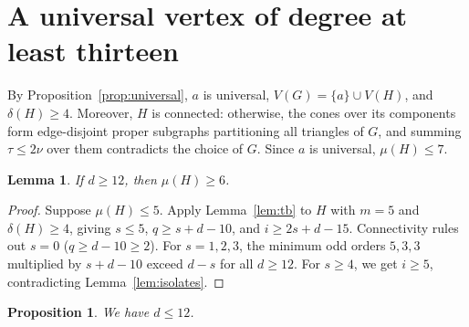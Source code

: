 \documentclass[11pt]{article}
\newtheorem{lemma}[theorem]{Lemma}
\newtheorem{proposition}[theorem]{Proposition}
\begin{document}
\section{A universal vertex of degree at least thirteen}

By Proposition~\ref{prop:universal}, $a$ is universal, $V(G)=\{a\}\cup V(H)$, and $\delta(H)\geq 4$. Moreover, $H$ is connected: otherwise, the cones over its components form edge-disjoint proper subgraphs partitioning all triangles of $G$, and summing $\tau\leq 2\nu$ over them contradicts the choice of $G$. Since $a$ is universal, $\mu(H)\leq 7$.

\begin{lemma}\label{lem:mu-at-least-6}
If $d\geq 12$, then $\mu(H)\geq 6$.
\end{lemma}

\begin{proof}
Suppose $\mu(H)\leq 5$. Apply Lemma~\ref{lem:tb} to $H$ with $m=5$ and $\delta(H)\geq 4$, giving $s\leq 5$, $q\geq s+d-10$, and $i\geq 2s+d-15$. Connectivity rules out $s=0$ ($q\geq d-10\geq 2$). For $s=1,2,3$, the minimum odd orders $5,3,3$ multiplied by $s+d-10$ exceed $d-s$ for all $d\geq 12$. For $s\geq 4$, we get $i\geq 5$, contradicting Lemma~\ref{lem:isolates}.
\end{proof}

\begin{proposition}\label{prop:deg13plus}
We have $d\leq 12$.
\end{proposition}
\end{document}
